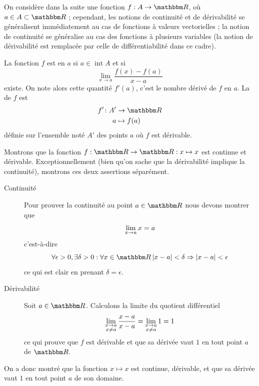 On considère dans la suite une fonction $f : A \to \eR$, où $a \in A \subset \eR$ ; cependant, les notions de continuité et de dérivabilité se généralisent immédiatement au cas de fonctions à valeurs vectorielles ; la notion de continuité se généralise au cas des fonctions à plusieurs variables (la notion de dérivabilité est remplacée par celle de différentiabilité dans ce cadre).

\begin{definition}      \label{DEFooOYFZooFWmcAB}
    La fonction $f$ est  en \( a\) si $a \in
  \operatorname{int} A$ et si
  \begin{equation*}
    \lim_{x\to a} \frac{f(x)-f(a)}{x-a}
  \end{equation*}
  existe. On note alors cette quantité $f'(a)$, c'est le nombre
  dérivé de $f$ en $a$. La  de $f$ est
  \begin{equation}
      \begin{aligned}
          f'\colon A'&\to \eR \\
          a&\mapsto f(a)
      \end{aligned}
  \end{equation}
  définie sur l'ensemble noté $A'$ des points $a$ où $f$ est dérivable.
\end{definition}

\begin{example}
      Montrons que la fonction $f : \eR \to \eR : x\mapsto x$ est continue et dérivable. Exceptionnellement (bien qu'on sache que la dérivabilité implique la continuité), montrons ces deux assertions séparément.
      \begin{description}
      \item[Continuité] Pour prouver la continuité au point $a \in \eR$ nous devons montrer que
     \begin{equation}
       \limite x a x = a
     \end{equation}
     c'est-à-dire
     \begin{equation}
       \forall \epsilon > 0, \exists \delta > 0 :  \forall x \in \eR \abs{x-a} <
       \delta \Rightarrow \abs{x-a} < \epsilon
     \end{equation}
     ce qui est clair en prenant $\delta = \epsilon$.

      \item[Dérivabilité] Soit $a \in \eR$. Calculons la limite du quotient différentiel
        \begin{equation}
          \limite[x\neq a]{x}{a} \frac{x-a}{x-a} = \limite[x\neq a]x a 1 = 1
        \end{equation}
        ce qui prouve que $f$ est dérivable et que sa dérivée vaut $1$ en
        tout point $a$ de $\eR$.
      \end{description}

     On a donc montré que la fonction $x \mapsto x$ est continue, dérivable, et que sa dérivée vaut $1$ en tout point $a$ de son domaine.

\end{example}

